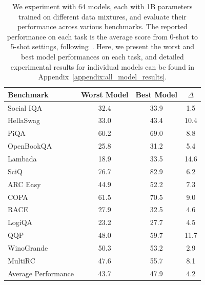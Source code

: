 \documentclass{article}
\theoremstyle{definition}
\theoremstyle{remark}
\begin{document}
\begin{table}[t]
    \centering
    \small
    \caption{We experiment with 64 models, each with 1B parameters trained on different data mixtures, and evaluate their performance across various benchmarks. The reported performance on each task is the average score from 0-shot to 5-shot settings, following~\citet{muennighoff2023scaling}. Here, we present the worst and best model performances on each task, and detailed experimental results for individual models can be found in Appendix~\ref{appendix:all_model_results}.}
    \vspace{1mm}
    \label{tab:worst_best_model_perf}
    \begin{tabular}{l|ccc}
    \toprule
     \textbf{Benchmark} & \textbf{Worst Model} & \textbf{Best Model} & $\Delta$ \\
     \midrule
        Social IQA~\citep{sap2019socialiqa} & 32.4 & 33.9 & 1.5 \\
        HellaSwag~\citep{zellers2019hellaswag} & 33.0 & 43.4 & 10.4 \\
        PiQA~\citep{bisk2020piqa} & 60.2 & 69.0 & 8.8 \\
        OpenBookQA~\citep{mihaylov2018can} & 25.8 & 31.2 & 5.4 \\
        Lambada~\citep{paperno2016lambada} & 18.9 & 33.5 & 14.6 \\
        SciQ~\citep{welbl2017crowdsourcing} & 76.7 & 82.9 & 6.2 \\
        ARC Easy~\citep{clark2018think} & 44.9 & 52.2 & 7.3 \\
        COPA~\citep{sarlin2020superglue}  & 61.5 & 70.5 & 9.0 \\
        RACE~\citep{lai2017race}  & 27.9 & 32.5 & 4.6 \\
        LogiQA~\citep{liu2020logiqa}  & 23.2 & 27.7 & 4.5 \\
        QQP~\citep{wang2018glue}  & 48.0 & 59.7 & 11.7 \\
        WinoGrande~\citep{sakaguchi2021winogrande} & 50.3 & 53.2 & 2.9 \\
        MultiRC~\citep{khashabi2018looking} & 47.6 & 55.7 & 8.1 \\
        \midrule
        Average Performance & 43.7 & 47.9 & 4.2 \\
    \bottomrule
    \end{tabular}
\end{table}
\end{document}
